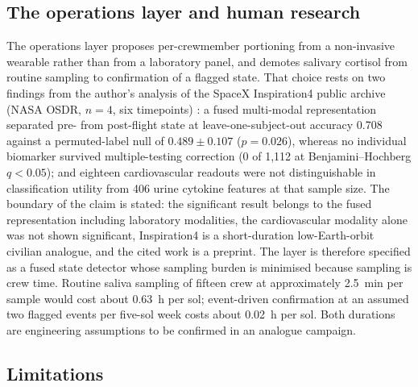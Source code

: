 \documentclass[11pt,a4paper,3p,authoryear]{elsarticle}
\begin{document}
\subsection{The operations layer and human research}

The operations layer proposes per-crewmember portioning from a non-invasive wearable rather than from a laboratory panel, and demotes salivary cortisol from routine sampling to confirmation of a flagged state. That choice rests on two findings from the author's analysis of the SpaceX Inspiration4 public archive (NASA OSDR, $n = 4$, six timepoints) \citep{PuertaAngulo2026hrp}: a fused multi-modal representation separated pre- from post-flight state at leave-one-subject-out accuracy 0.708 against a permuted-label null of $0.489 \pm 0.107$ ($p = 0.026$), whereas no individual biomarker survived multiple-testing correction (0 of 1,112 at Benjamini--Hochberg $q < 0.05$); and eighteen cardiovascular readouts were not distinguishable in classification utility from 406 urine cytokine features at that sample size. The boundary of the claim is stated: the significant result belongs to the fused representation including laboratory modalities, the cardiovascular modality alone was not shown significant, Inspiration4 is a short-duration low-Earth-orbit civilian analogue, and the cited work is a preprint. The layer is therefore specified as a fused state detector whose sampling burden is minimised because sampling is crew time. Routine saliva sampling of fifteen crew at approximately \SI{2.5}{\minute} per sample would cost about \SI{0.63}{\hour} per sol; event-driven confirmation at an assumed two flagged events per five-sol week costs about \SI{0.02}{\hour} per sol. Both durations are engineering assumptions to be confirmed in an analogue campaign.

\subsection{Limitations}\label{sec:limitations}
\end{document}

